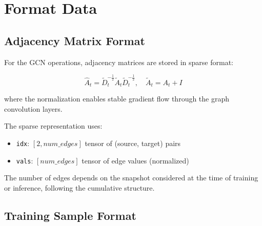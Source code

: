\section{Format Data}

\subsection*{Adjacency Matrix Format}

For the GCN operations, adjacency matrices are stored in sparse format:

\begin{equation}
	\hat{A}_t = \tilde{D}_t^{-\frac{1}{2}} \tilde{A}_t \tilde{D}_t^{-\frac{1}{2}}, \quad \tilde{A}_t = A_t + I
\end{equation}

where the normalization enables stable gradient flow through the graph convolution layers.

The sparse representation uses:
\begin{itemize}
	\item \texttt{idx}: $[2, num\_edges]$ tensor of (source, target) pairs
	\item \texttt{vals}: $[num\_edges]$ tensor of edge values (normalized)
\end{itemize}

The number of edges depends on the snapshot considered at the time of training or inference, following the cumulative structure.




\subsection*{Training Sample Format}

